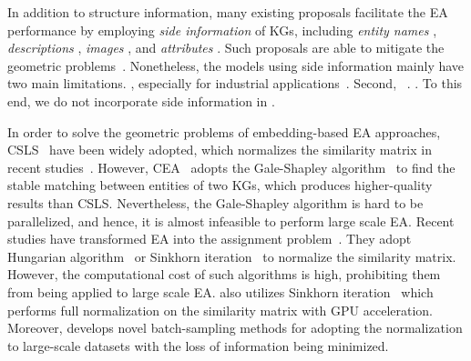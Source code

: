 In addition to structure information, many existing proposals facilitate the EA performance by employing \emph{side information} of KGs,  including
\emph{entity names} \cite{JAPE17,MultiKE19,DGMC20,DegreeAware20,BERT-INT20, AttrGNN20, EASY21, SEU21, LargeEA22}, \emph{descriptions} \cite{MultiKE19, BERT-INT20}, \emph{images} \cite{EVA20}, and \emph{attributes} \cite{JAPE17,GCN-Align18,MultiKE19,COTSAE20,BERT-INT20,AttrGNN20,EPEA20}. Such proposals are able to mitigate the geometric problems~\cite{OpenEA2020VLDB}.
Nonetheless, the models using side information mainly have two main limitations. , especially for
industrial applications~\cite{DualAMN21,RREA20, MRAEA20}.
Second, ~\cite{JEANS20, AttrGNN20, EVA20, NoMatch21}.
.
To this end, we do not incorporate side information in \ClusterEA{}.

In order to solve the geometric problems of embedding-based EA approaches, CSLS~\cite{CSLS} have been widely adopted, which normalizes the similarity matrix in recent studies~\cite{TransEdge19,EVA20, RREA20, EASY21}.
However, 
CEA~\cite{CEAFF20, CEAFF21} adopts the Gale-Shapley algorithm~\cite{GaleShapley} to find the stable matching between entities of two KGs, which produces higher-quality results than CSLS.
Nevertheless, the Gale-Shapley algorithm is hard to be parallelized, and hence, it is almost infeasible to perform large scale EA. Recent studies have transformed EA into the assignment problem~\cite{EASY21, SEU21}. They adopt Hungarian algorithm~\cite{Hungarian1955} or Sinkhorn iteration~\cite{Sinkhorn13} to normalize the similarity matrix. However, the computational cost of such algorithms is high, prohibiting them from being applied to large scale EA.
\ClusterEA{} also utilizes Sinkhorn iteration~\cite{Sinkhorn13} which performs full normalization on the similarity matrix with GPU acceleration. Moreover, \ClusterEA{} develops novel batch-sampling methods for adopting the normalization to large-scale datasets with the loss of information being minimized.



